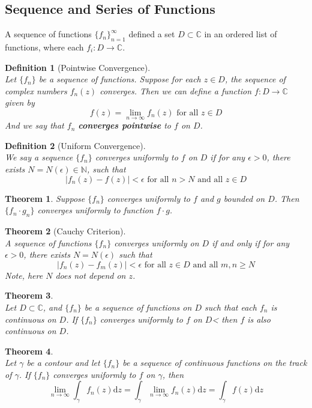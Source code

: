 \documentclass[12pt]{article}
\newcommand{\diff}{\mathrm{d}}
\newtheorem{definition}{Definition}[section]
\newtheorem{theorem}{Theorem}[section]
\theoremstyle{definition}
\begin{document}
\subsection{Sequence and Series of Functions}
A sequence of functions $\{f_n\}_{n=1}^\infty$ defined a set $D\subset \mathbb{C}$ in an ordered list of functions, where each $f_i:D\to \mathbb{C}$.
\begin{definition}[Pointwise Convergence]
\hfill\\\normalfont Let $\{f_n\}$ be a sequence of functions. Suppose for each $z\in D$, the sequence of complex numbers ${f_n(z)}$ converges. Then we can define a function $f:D\to\mathbb{C}$ given by
\[
f(z)=\lim_{n\to\infty}f_n(z)\text{ for all }z\in D
\]
And we say that ${f_n}$ \textbf{converges pointwise} to $f$ on $D$.
\end{definition}
\begin{definition}[Uniform Convergence]
\hfill\\\normalfont We say a sequence $\{f_n\}$ converges uniformly to $f$ on $D$ if for any $\epsilon>0$, there exists $N=N(\epsilon)\in \mathbb{N}$, such that
\[
|f_n(z)-f(z)|<\epsilon \text{ for all }n>N \text{ and all }z\in D
\]
\end{definition}
\begin{theorem}\normalfont Suppose $\{f_n\}$ converges uniformly to $f$ and $g$ bounded on $D$. Then $\{f_n\cdot g_n\}$ converges uniformly to function $f\cdot g$.
\end{theorem}
\begin{theorem}[Cauchy Criterion]
\hfill\\\normalfont A sequence of functions $\{f_n\}$ converges uniformly on $D$ if and only if for any $\epsilon>0$, there exists $N=N(\epsilon)$ such that
\[
|f_n(z)-f_m(z)|<\epsilon \text{ for all }z\in D\text{ and all }m,n\geq N
\]
Note, here $N$ does not depend on $z$.
\end{theorem}
\begin{theorem}
\hfill\\\normalfont Let $D\subset\mathbb{C}$, and $\{f_n\}$ be a sequence of functions on $D$ such that each $f_n$ is continuous on $D$. If $\{f_n\}$ converges uniformly to $f$ on $D$< then $f$ is also continuous on $D$.
\end{theorem}
\begin{theorem}\hfill\\\normalfont Let $\gamma$ be a contour and let $\{f_n\}$ be a sequence of continuous functions on the track of $\gamma$. If $\{f_n\}$ converges uniformly to $f$ on $\gamma$, then 
\[
\lim_{n\to\infty}\int_\gamma f_n(z)\diff z = \int_\gamma \lim_{n\to\infty}f_n(z)\diff z = \int_\gamma f(z)\diff z
\]
\end{theorem}
\end{document}
